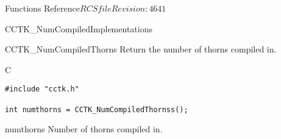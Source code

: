 \begin{cactuspart}{ Functions Reference}{$RCSfile$}{$Revision: 4641 $}
\begin{FunctionDescription}{CCTK\_NumCompiledImplementations}

\end{FunctionDescription}



\begin{FunctionDescription}{CCTK\_NumCompiledThorns}
\label{CCTK-NumCompiledThorns}
Return the number of thorns compiled in.

\begin{SynopsisSection}
\begin{Synopsis}{C}
\begin{verbatim}
#include "cctk.h"

int numthorns = CCTK_NumCompiledThornss();
\end{verbatim}
\end{Synopsis}
\end{SynopsisSection}

\begin{ResultSection}
\begin{Result}{numthorns}
Number of thorns compiled in.
\end{Result}
\end{ResultSection}




\end{FunctionDescription}
\end{cactuspart}
